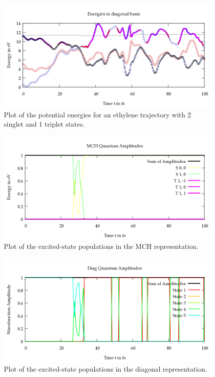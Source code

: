 \documentclass[a4paper,11pt,DIV=15,openany]{scrbook}
\begin{document}
\begin{figure}[p]
  \centering
  \includegraphics[width=\textwidth]{figures/energy.png}
  \caption{Plot of the potential energies for an ethylene trajectory with 2 singlet and 1 triplet states. }
  \label{fig:en}
\end{figure}
\begin{figure}[p]
  \centering
  \includegraphics[width=\textwidth]{figures/coeff_MCH.png}
  \caption{Plot of the excited-state populations in the MCH representation.}
  \label{fig:cMCH}
\end{figure}
\begin{figure}[p]
  \centering
  \includegraphics[width=\textwidth]{figures/coeff_diag.png}
  \caption{Plot of the excited-state populations in the diagonal representation.}
  \label{fig:cDIAG}
\end{figure}
\end{document}

